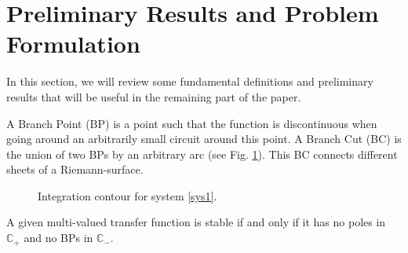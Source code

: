 \documentclass[twoside,reqno,11pt]{fcaa-var} %
\begin{document}
\section{Preliminary Results and Problem Formulation}\label{sec:Prel}
In this section, we will review some fundamental definitions and preliminary results that will be useful in the remaining part of the paper.
\begin{definition}
	A Branch Point (BP) is a point such that the function is discontinuous when going around an arbitrarily small circuit around this point. A Branch Cut (BC) is the union of two BPs by an arbitrary arc (see Fig. \ref{contour1}). This BC connects different sheets of a Riemann-surface.
\end{definition}
\begin{figure}[h!]
	\centering
	 
	\caption{Integration contour for system \eqref{sys1}.}\label{contour1}
\end{figure}
\begin{theorem} \label{th:th1}
	A given multi-valued transfer function is stable if and only if it has no poles in $\mathbb{C}_+$ and no BPs in $\mathbb{C}_-$.
\end{theorem}
\end{document}
